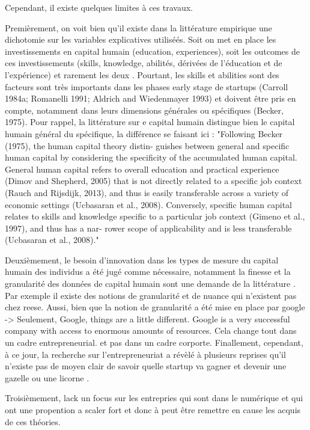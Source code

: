 \documentclass[11pt]{article}
\begin{document}
Cependant, il existe quelques limites à ces travaux.

Premièrement, on voit bien qu'il existe dans la littérature empirique une dichotomie sur les variables explicatives utiliséés. Soit on met en place les investissements en capital humain (education, experiences), soit les outcomes de ces investissements (skills, knowledge, abilités, dérivées de l'éducation et de l'expérience) et rarement les deux \citet{becker1964human, unger2011human, marvel2016human, reese2020should}. Pourtant, les skills et abilities sont des facteurs sont très importants dans les phases early stage de startups (Carroll 1984a; Romanelli 1991; Aldrich and Wiedenmayer 1993) et doivent être pris en compte, notamment dans leurs dimensions générales ou spécifiques (Becker, 1975). Pour rappel, la littérature sur e capital humain distingue bien le capital humain général du spécifique, la différence se faisant ici :
"Following Becker (1975), the human capital theory distin- guishes between general and specific human capital by considering the specificity of the accumulated human capital. General human capital refers to overall education and practical experience (Dimov and Shepherd, 2005) that is not directly related to a specific job context (Rauch and Rijsdijk, 2013), and thus is easily transferable across a variety of economic settings (Ucbasaran et al., 2008). Conversely, specific human capital relates to skills and knowledge specific to a particular job context (Gimeno et al., 1997), and thus has a nar- rower scope of applicability and is less transferable (Ucbasaran et al., 2008)."

Deuxièmement, le besoin d'innovation dans les types de mesure du capital humain des individus a été jugé comme nécessaire, notamment la finesse et la granularité des données de capital humain sont une demande de la littérature \citep{marvel2016human}. Par exemple il existe des notions de granularité et de nuance qui n'existent pas chez reese. Aussi, bien que la notion de granularité a été mise en place par google -> Seulement, Google, things are a little different. Google is a very successful company with access to enormous amounts of resources. Cela change tout dans un cadre entrepreneurial. et pas dans un cadre corporte. Finallement, cependant, à ce jour, la recherche sur l'entrepreneuriat a révèlé à plusieurs reprises qu'il n'existe pas de moyen clair de savoir quelle startup va gagner et devenir une gazelle ou une licorne \citep{aldrich2018unicorns}.

Troisièmement, lack un focus sur les entrepries qui sont dans le numérique et qui ont une propention a scaler fort et donc à peut être remettre en cause les acquis de ces théories.
\end{document}
